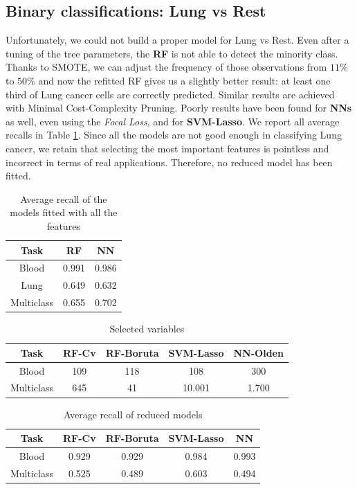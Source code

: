 \documentclass[a4paper,11pt, oneside]{article}  %
\begin{document}
\subsection{Binary classifications: Lung vs Rest}
Unfortunately,  we could not build a proper model for Lung vs Rest.  Even after a tuning of the tree parameters,  the \textbf{RF} is not able to detect the minority class.  Thanks to SMOTE, we can adjust the frequency of those observations from $11\%$ to $50\%$ and now the refitted RF gives us a slightly better result: at least one third of Lung cancer cells are correctly predicted.  Similar results are achieved with Minimal Cost-Complexity Pruning. Poorly results have been found for \textbf{NNs} as well,  even using the \textit{Focal Loss}, and for \textbf{SVM-Lasso}. We report all average recalls in Table \ref{table:big_models}.  Since all the models are not good enough in classifying Lung cancer, we retain that selecting the most important features is pointless and incorrect in terms of real applications. Therefore, no reduced model has been fitted.



\begin{table}[h!]
 \centering
 \begin{tabular}{c c c}
  \hline\hline
  Task & RF & NN \\ [0.5ex] %
  \hline
  Blood & 0.991  & 0.986 \\
  Lung & 0.649  & 0.632 \\
  Multiclass & 0.655 & 0.702 \\ [1ex]
  \hline
 \end{tabular}
 \caption{Average recall of the models fitted with all the features}
 \label{table:big_models}
\end{table}


\begin{table}[h!]
 \centering
 \begin{tabular}{c c c c c}
  \hline\hline
  Task & RF-Cv &  RF-Boruta & SVM-Lasso & NN-Olden \\ [0.5ex] %
  \hline
  Blood & 109 & 118 & 108 & 300 \\
  Multiclass & 645 &  41 & 10.001 & 1.700 \\ [1ex]
  \hline
 \end{tabular}
 \caption{Selected variables}
 \label{table:selected variables}
\end{table}

\begin{table}
 \centering
 \begin{tabular}{c c c c c}
  \hline\hline
  Task & RF-Cv & RF-Boruta & SVM-Lasso & NN \\ [0.5ex] %
  \hline
  Blood & 0.929 & 0.929 & 0.984 & 0.993 \\
  Multiclass & 0.525 & 0.489 & 0.603 & 0.494 \\ [1ex]
  \hline
 \end{tabular}
 \caption{Average recall of reduced models}
 \label{table:reduced_models}
\end{table}
\end{document}
